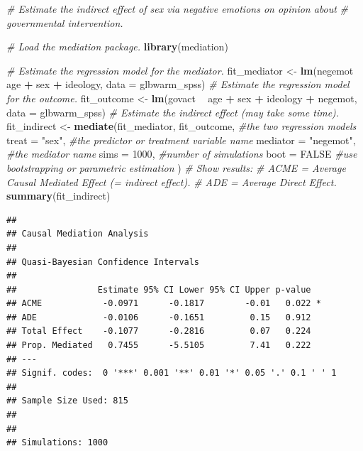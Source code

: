 \documentclass[doc,floatsintext]{apa6}
\newenvironment{Shaded}{\begin{snugshade}}{\end{snugshade}}
\newcommand{\KeywordTok}[1]{\textcolor[rgb]{0.13,0.29,0.53}{\textbf{#1}}}
\newcommand{\DataTypeTok}[1]{\textcolor[rgb]{0.13,0.29,0.53}{#1}}
\newcommand{\DecValTok}[1]{\textcolor[rgb]{0.00,0.00,0.81}{#1}}
\newcommand{\StringTok}[1]{\textcolor[rgb]{0.31,0.60,0.02}{#1}}
\newcommand{\CommentTok}[1]{\textcolor[rgb]{0.56,0.35,0.01}{\textit{#1}}}
\newcommand{\OtherTok}[1]{\textcolor[rgb]{0.56,0.35,0.01}{#1}}
\newcommand{\OperatorTok}[1]{\textcolor[rgb]{0.81,0.36,0.00}{\textbf{#1}}}
\newcommand{\NormalTok}[1]{#1}
\begin{document}
\begin{Shaded}
\begin{Highlighting}[]
\CommentTok{# Estimate the indirect effect of sex via negative emotions on opinion about}
\CommentTok{# governmental intervention.}

\CommentTok{# Load the mediation package.}
\KeywordTok{library}\NormalTok{(mediation)}

\CommentTok{# Estimate the regression model for the mediator.}
\NormalTok{fit_mediator <-}\StringTok{ }\KeywordTok{lm}\NormalTok{(negemot }\OperatorTok{~}\StringTok{ }\NormalTok{age }\OperatorTok{+}\StringTok{ }\NormalTok{sex }\OperatorTok{+}\StringTok{ }\NormalTok{ideology, }\DataTypeTok{data =}\NormalTok{ glbwarm_spss) }
\CommentTok{# Estimate the regression model for the outcome.}
\NormalTok{fit_outcome <-}\StringTok{ }\KeywordTok{lm}\NormalTok{(govact }\OperatorTok{~}\StringTok{ }\NormalTok{age }\OperatorTok{+}\StringTok{ }\NormalTok{sex }\OperatorTok{+}\StringTok{ }\NormalTok{ideology }\OperatorTok{+}\StringTok{ }\NormalTok{negemot, }\DataTypeTok{data =}\NormalTok{ glbwarm_spss) }
\CommentTok{# Estimate the indirect effect (may take some time).}
\NormalTok{fit_indirect <-}\StringTok{ }\KeywordTok{mediate}\NormalTok{(fit_mediator, fit_outcome, }\CommentTok{#the two regression models}
                        \DataTypeTok{treat =} \StringTok{"sex"}\NormalTok{, }\CommentTok{#the predictor or treatment variable name}
                        \DataTypeTok{mediator =} \StringTok{"negemot"}\NormalTok{, }\CommentTok{#the mediator name}
                        \DataTypeTok{sims =} \DecValTok{1000}\NormalTok{, }\CommentTok{#number of simulations}
                        \DataTypeTok{boot =} \OtherTok{FALSE} \CommentTok{#use bootstrapping or parametric estimation}
\NormalTok{                        )}
\CommentTok{# Show results:}
\CommentTok{# ACME = Average Causal Mediated Effect (= indirect effect).}
\CommentTok{# ADE = Average Direct Effect.}
\KeywordTok{summary}\NormalTok{(fit_indirect)}
\end{Highlighting}
\end{Shaded}

\begin{verbatim}
## 
## Causal Mediation Analysis 
## 
## Quasi-Bayesian Confidence Intervals
## 
##                Estimate 95% CI Lower 95% CI Upper p-value  
## ACME            -0.0971      -0.1817        -0.01   0.022 *
## ADE             -0.0106      -0.1651         0.15   0.912  
## Total Effect    -0.1077      -0.2816         0.07   0.224  
## Prop. Mediated   0.7455      -5.5105         7.41   0.222  
## ---
## Signif. codes:  0 '***' 0.001 '**' 0.01 '*' 0.05 '.' 0.1 ' ' 1
## 
## Sample Size Used: 815 
## 
## 
## Simulations: 1000
\end{verbatim}
\end{document}
